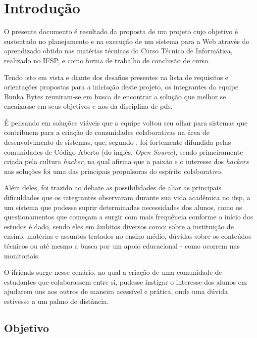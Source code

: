 
\chapter{Introdução}
O presente documento é resultado da proposta de um projeto cujo objetivo é sustentado no planejamento e na execução de um sistema para a Web através do aprendizado obtido nas matérias técnicas do Curso Técnico de Informática, realizado no IFSP, e como forma de trabalho de conclusão de curso.

Tendo isto em vista e diante dos desafios presentes na lista de requisitos e orientações propostas para a iniciação deste projeto, os integrantes da equipe Bunka Bytes reuniram-se em busca de encontrar a solução que melhor se encaixasse em seus objetivos e nos da disciplina de \acs{pds}.

É pensando em soluções viáveis que a equipe voltou seu olhar para sistemas que contribuem para a criação de comunidades colaborativas na área de desenvolvimento de sistemas, que, segundo , foi fortemente difundida pelas comunidades de Código Aberto (do inglês, \textsl{Open Source}), sendo primeiramente criada pela cultura \textsl{hacker}, na qual afirma que a paixão e o interesse dos \textsl{hackers} nas soluções foi uma das principais propulsoras do espírito colaborativo.

Além deles, foi trazido ao debate as possibilidades de aliar as principais dificuldades que os integrantes observaram durante sua vida acadêmica no \acs{ifsp}, a um sistema que pudesse suprir determinadas necessidades dos alunos, como os questionamentos que começam a surgir com mais frequência conforme o início dos estudos é dado, sendo eles em âmbitos diversos como: sobre a instituição de ensino, matérias e assuntos tratados no ensino médio, dúvidas sobre os conteúdos técnicos ou até mesmo a busca por um apoio educacional - como ocorrem nas monitoriais. 

O \gls{ifriends} surge nesse cenário, no qual a criação de uma comunidade de estudantes que colaborassem entre si, pudesse instigar o interesse dos alunos em ajudarem uns aos outros de maneira acessível e prática, onde uma dúvida estivesse a um palmo de distância.


\section{Objetivo}

